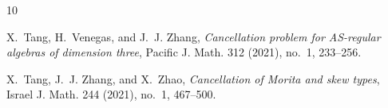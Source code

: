 \documentclass{amsart}
\theoremstyle{plain}
\numberwithin{theorem}{section}
\numberwithin{equation}{theorem}
\theoremstyle{definition}
\begin{document}
\begin{thebibliography}{10}





X.~Tang, H.~Venegas, and J.~J. Zhang,
\emph{Cancellation problem for AS-regular algebras of dimension three},
Pacific J. Math. 312 (2021), no.~1, 233--256.

X.~Tang, J.~J. Zhang, and X.~Zhao,
\emph{Cancellation of Morita and skew types},
Israel J. Math. 244 (2021), no.~1, 467--500.




\end{thebibliography}
\end{document}
